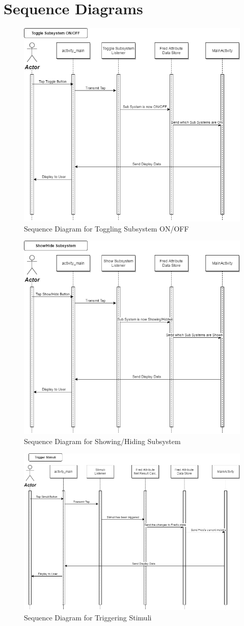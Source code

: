 \documentclass[]{article}
\begin{document}
\section{Sequence Diagrams}
\label{sec:sequence_diagrams}
\begin{figure}[H]
	\centering
	\includegraphics[width=0.7\linewidth]{../Resources/Toggle_Subsystem_Sequence_Diagram.png}
	\caption{Sequence Diagram for Toggling Subsystem ON/OFF}
\end{figure}

\begin{figure}[H]
	\centering
	\includegraphics[width=0.7\linewidth]{../Resources/Show_Subsystem_Sequence_Diagram.png}
	\caption{Sequence Diagram for Showing/Hiding Subsystem}
\end{figure}
\begin{figure}[H]
	\centering
	\includegraphics[width=0.7\linewidth]{../Resources/Trigger_Stimuli_Sequence_Diagram.png}
	\caption{Sequence Diagram for Triggering Stimuli}
\end{figure}
\end{document}
